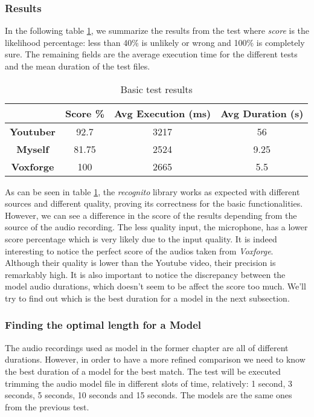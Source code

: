 \subsubsection{Results}

In the following table \ref{tab:basicres}, we summarize the results from the test where \textit{score} is the
likelihood percentage: less than 40\% is unlikely or wrong and 100\% is completely sure.
The remaining fields are the average execution time for the different tests and the mean duration
of the test files.
\begin{table}

\centering
\caption{Basic test results}
\label{tab:basicres}
\begin{tabular}{|c|c|c|c|} \hline
& \textbf{Score \%} & \textbf{Avg Execution (ms)} & \textbf{Avg Duration (s)}\\ \hline
\textbf{Youtuber} & 92.7 & 3217 & 56 \\ \hline
\textbf{Myself} & 81.75 & 2524 & 9.25  \\ \hline
\textbf{Voxforge} & 100 & 2665 & 5.5  \\ \hline
\end{tabular}
\end{table}

As can be seen in table \ref{tab:basicres}, the \textit{recognito} library works as expected with
different sources and different quality, proving its correctness for the basic functionalities.
However, we can see a difference in the score of the results depending from the source of the
audio recording. The less quality input, the microphone, has a lower score percentage which is very likely
due to the input quality. It is indeed interesting to notice the perfect score of the audios
taken from \textit{Voxforge}. Although their quality is lower than the Youtube video, their
precision is remarkably high. It is also important to notice the discrepancy between the model
audio durations, which doesn't seem to be affect the score too much. We'll try
to find out which is the best duration for a model in the next subsection.

\subsubsection{Finding the optimal length for a Model}
\label{opt-model}

The audio recordings used as model in the former chapter are all of different durations.
However, in order to have a more refined comparison we need to know the best duration of a model
for the best match.\newline
The test will be executed trimming the audio model file in different slots of time, relatively:
1 second, 3 seconds, 5 seconds, 10 seconds and 15 seconds. The models are the same ones
from the previous test.
\pgfplotsset{width=10cm,compat=1.9}

